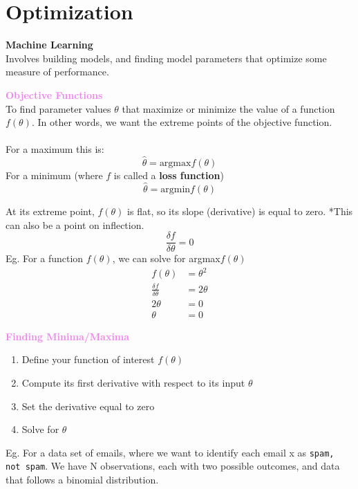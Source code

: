 \documentclass[a4paper,10pt]{article}
\begin{document}
\section*{Optimization}
\textcolor{Periwinkle}{\textbf{Machine Learning}}\\
Involves building models, and finding model parameters that optimize some measure of performance. 
\begin{shaded}
	\noindent \textcolor{Violet}{\textbf{Objective Functions}}\\
	To find parameter values $\theta$ that maximize or minimize the value of a function $f(\theta)$. In other words, we want the extreme points of the objective function. \\\\
	For a maximum this is: 
	\begin{equation*}
		\hat{\theta} = \text{argmax}f(\theta)
	\end{equation*}
	For a minimum (where $f$ is called a \textbf{loss function})
	\begin{equation*}
		\hat{\theta} = \text{argmin}f(\theta)
	\end{equation*}
\end{shaded}
\noindent At its extreme point, $f(\theta)$ is flat, so its slope (derivative) is equal to zero. *This can also be a point on inflection. 
\begin{equation*}
	\frac{\delta f}{\delta \theta} = 0
\end{equation*}
Eg. For a function $f(\theta)$, we can solve for argmax$f(\theta)$
\begin{align*}
	f(\theta) &= \theta^{2} \\
	\frac{\delta f}{\delta \theta} &= 2 \theta \\
	2\theta &= 0 \\
	\theta &= 0
\end{align*}
\begin{shaded}
	\noindent \textcolor{Violet}{\textbf{Finding Minima/Maxima}}
	\begin{enumerate}
		\item Define your function of interest $f(\theta)$ 
		\item Compute its first derivative with respect to its input $\theta$
		\item Set the derivative equal to zero 
		\item Solve for $\theta$
	\end{enumerate}
\end{shaded}
\noindent Eg. For a data set of emails, where we want to identify each email x as \texttt{spam, not spam}. We have N observations, each with two possible outcomes, and data that follows a binomial distribution. 
\end{document}
